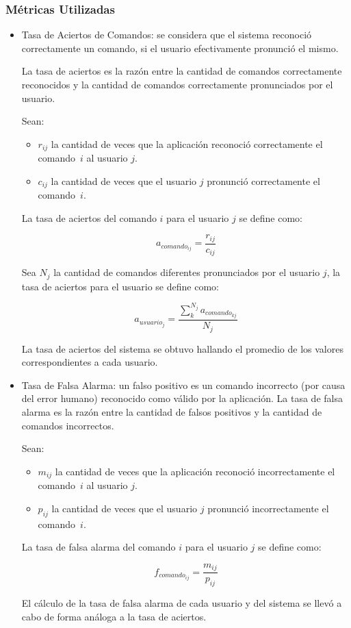 \subsubsection{M\'etricas Utilizadas}
\begin{itemize}
	\item Tasa de Aciertos de Comandos: se considera que el sistema reconoci\'o correctamente
	un comando, si el usuario efectivamente pronunci\'o el mismo.

	La tasa de aciertos es la raz\'on entre la cantidad de comandos correctamente reconocidos 
	y la cantidad de comandos correctamente pronunciados por el usuario.
	
	Sean:

	\begin{itemize}
		\item $r_{ij}$ la cantidad de veces que la aplicaci\'on reconoci\'o correctamente el \mbox{comando $i$}
		al usuario $j$.
		\item $c_{ij}$ la cantidad de veces que el usuario $j$ pronunci\'o correctamente el \mbox{comando $i$.}
	\end{itemize}
	La tasa de aciertos del comando $i$ para el usuario $j$ se define como: 

	\begin{equation*}
		a_{{comando}_{ij}}=\frac{r_{ij}}{c_{ij}}
	\end{equation*}


	Sea $N_{j}$ la cantidad de comandos diferentes pronunciados por el usuario $j$,
	la tasa de aciertos para el usuario  se define como:
	
	\begin{equation*}
		a_{{usuario}_j}=\frac{\sum_k^{N_{j}}a_{{comando}_{kj}}}{N_{j}}
	\end{equation*}

	La tasa de aciertos del sistema se obtuvo hallando el promedio de los valores correspondientes
	a cada usuario.


	\item Tasa de Falsa Alarma: un falso positivo es un comando incorrecto (por causa del error humano)
	reconocido como v\'alido por la aplicaci\'on.
	La tasa de falsa alarma es la raz\'on entre la cantidad de falsos positivos y la cantidad
	de comandos incorrectos. 

	Sean:

	\begin{itemize}
		\item $m_{ij}$ la cantidad de veces que la aplicaci\'on reconoci\'o incorrectamente el \mbox{comando $i$}
		al usuario $j$.
		\item $p_{ij}$ la cantidad de veces que el usuario $j$ pronunci\'o incorrectamente el \mbox{comando $i$.}
	\end{itemize}
	La tasa de falsa alarma del comando $i$ para el usuario $j$ se define como: 

	\begin{equation*}
		f_{{comando}_{ij}}=\frac{m_{ij}}{p_{ij}}
	\end{equation*}

	El c\'alculo de la tasa de falsa alarma de cada usuario y del sistema se llev\'o a cabo de forma an\'aloga 
	a la tasa de aciertos.
\end{itemize}
